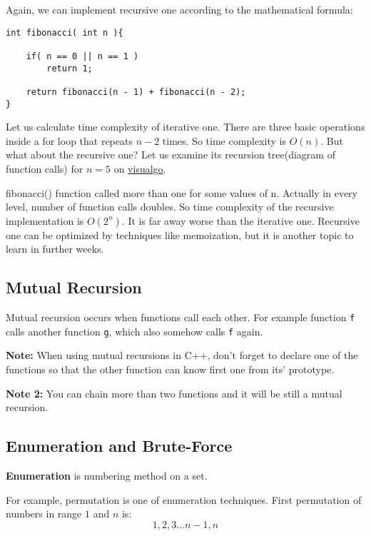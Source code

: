 \documentclass[12pt]{article}
\begin{document}
Again, we can implement recursive one according to the mathematical formula:

\begin{verbatim}
int fibonacci( int n ){

    if( n == 0 || n == 1 )
        return 1;
    
    return fibonacci(n - 1) + fibonacci(n - 2);
}
\end{verbatim}

Let us calculate time complexity of iterative one. There are three basic operations inside a for loop that repeats $n-2$ times. So time complexity is $O(n)$. But what about the recursive one? Let us examine its recursion tree(diagram of function calls) for $n = 5$ on \href{https://visualgo.net/en/recursion}{visualgo}.


fibonacci() function called more than one for some values of n. Actually in every level, number of function calls doubles. So time complexity of the recursive implementation is $O(2^n)$. It is far away worse than the iterative one. Recursive one can be optimized by techniques like memoization, but it is another topic to learn in further weeks.



\subsection{Mutual Recursion}

Mutual recursion occurs when functions call each other. For example function \lstinline{f} calls another function \lstinline{g}, which also somehow calls \lstinline{f} again.

\textbf{Note:} When using mutual recursions in C++, don't forget to declare one of the functions so that the other function can know first one from its' prototype.

\textbf{Note 2:} You can chain more than two functions and it will be still a mutual recursion.

\subsection{Enumeration and Brute-Force}

\textbf{Enumeration} is numbering method on a set.

For example, permutation is one of enumeration techniques. First permutation of numbers in range $1$ and $n$ is:
$$1, 2, 3... n-1, n$$
\end{document}
